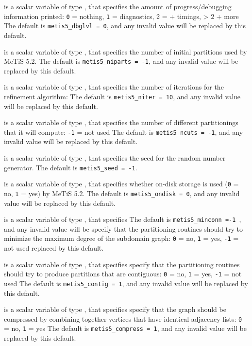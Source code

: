 \documentclass{galahad}
\begin{document}
\begin{description}
 is a scalar variable of type \integer, that specifies
the amount of progress/debugging information printed: {\tt 0} = nothing, 
 {\tt 1} = diagnostics, 2 = + timings, > 2 + more
The default is {\tt metis5\_dbglvl = 0}, and any invalid value will be
replaced by this default.

 is a scalar variable of type \integer, that specifies
the number of initial partitions used by MeTiS 5.2.
The default is {\tt metis5\_niparts = -1}, and any invalid value will be
replaced by this default.

 is a scalar variable of type \integer, that specifies
the number of iterations for the refinement algorithm:
The default is {\tt metis5\_niter = 10}, and any invalid value will be
replaced by this default.

 is a scalar variable of type \integer, that specifies
the number of different partitionings that it will compute: {\tt -1} = not used
The default is {\tt metis5\_ncuts = -1}, and any invalid value will be
replaced by this default.

 is a scalar variable of type \integer, that specifies
the seed for the random number generator.
The default is {\tt metis5\_seed = -1}.

 is a scalar variable of type \integer, that specifies
whether on-disk storage is used ({\tt 0} = no, {\tt 1} = yes) by MeTiS 5.2.
The default is {\tt metis5\_ondisk = 0}, and any invalid value will be
replaced by this default.

 is a scalar variable of type \integer, that specifies
The default is {\tt metis5\_minconn =-1  }, and any invalid value will be
specify that the partitioning routines should try to minimize the maximum 
degree of the subdomain graph: {\tt 0} = no, {\tt 1} = yes, {\tt -1} = not used
replaced by this default.

 is a scalar variable of type \integer, that specifies
specify that the partitioning routines should try to produce partitions 
that are contiguous: {\tt 0} = no, {\tt 1} = yes, {\tt -1} = not used
The default is {\tt metis5\_contig = 1}, and any invalid value will be
replaced by this default.

 is a scalar variable of type \integer, that specifies
specify that the graph should be compressed by combining together vertices 
that have identical adjacency lists: {\tt 0} = no, {\tt 1} = yes
The default is {\tt metis5\_compress = 1}, and any invalid value will be
replaced by this default.


\end{description}
\end{document}
